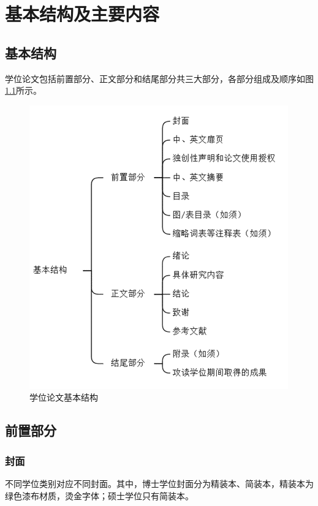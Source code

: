 \chapter{基本结构及主要内容}\label{第1章}

\section{基本结构}

学位论文包括前置部分、正文部分和结尾部分共三大部分，各部分组成及顺序如图\ref{fig:学位论文基本结构}所示。

\begin{figure}[h]
    \centering
    \includegraphics[width=0.7\linewidth]{figures/figure1.png}
    \caption{学位论文基本结构}
    \label{fig:学位论文基本结构}
\end{figure}

\section{前置部分}

\subsection{封面}

不同学位类别对应不同封面。其中，博士学位封面分为精装本、简装本，精装本为绿色漆布材质，烫金字体；硕士学位只有简装本。

